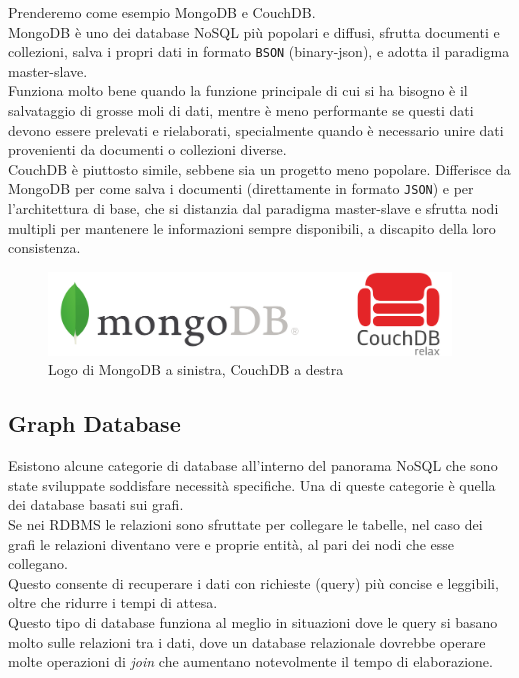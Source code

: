 \noindent Prenderemo come esempio MongoDB e CouchDB.\\
MongoDB è uno dei database NoSQL più popolari e diffusi, sfrutta documenti e collezioni, salva i propri dati in formato \texttt{BSON} (binary-json), e adotta il paradigma \gls{master-slave}.\\
Funziona molto bene quando la funzione principale di cui si ha bisogno è il salvataggio di grosse moli di dati, mentre è meno performante se questi dati devono essere prelevati e rielaborati, specialmente quando è necessario unire dati provenienti da documenti o collezioni diverse.\\
CouchDB è piuttosto simile, sebbene sia un progetto meno popolare. Differisce da MongoDB per come salva i documenti (direttamente in formato \texttt{JSON}) e per l'architettura di base, che si distanzia dal paradigma \gls{master-slave} e sfrutta nodi multipli per mantenere le informazioni sempre disponibili, a discapito della loro consistenza.

\begin{figure}[htbp]
\begin{center}
\includegraphics[height=6em]{immagini/tecnologies-logos/MongoDB-CouchDB-Logo.png}
\caption{Logo di MongoDB a sinistra, CouchDB a destra}
\end{center}
\end{figure}

\subsection{Graph Database}
Esistono alcune categorie di database all'interno del panorama NoSQL che sono state sviluppate soddisfare necessità specifiche. Una di queste categorie è quella dei database basati sui grafi.\\
Se nei RDBMS le relazioni sono sfruttate per collegare le tabelle, nel caso dei grafi le relazioni diventano vere e proprie entità, al pari dei nodi che esse collegano.\\
Questo consente di recuperare i dati con richieste (query) più concise e leggibili, oltre che ridurre i tempi di attesa.\\
Questo tipo di database funziona al meglio in situazioni dove le query si basano molto sulle relazioni tra i dati, dove un database relazionale dovrebbe operare molte operazioni di \textit{join} che aumentano notevolmente il tempo di elaborazione.\\

